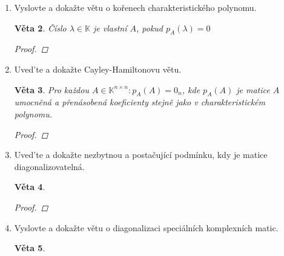 \documentclass[10pt,a4paper]{article}
\theoremstyle{plain}
\newtheorem{veta}{Věta}
\theoremstyle{definition}
\begin{document}
\begin{enumerate}
\begin{veta}
\begin{proof}
Nyní vyjádřeme 0 dvěma způsoby:

\[0 = \lambda_k 0 = \lambda_k \sum^k_{i=1} a_i u_i = \sum^k_{i=1} \lambda_k a_i u_i \]
\[ 0 = f(0) = f(\sum^k_{i=1} a_i u_i) = \sum^k_{i=1} a_i f(u_i) = \sum^k_{i=1} \lambda_i a_i u_i\]

\hfill

\[ 0 = 0 - 0 = \sum_{i = 1}^{k-1} (\lambda_i - \lambda_k) a_i u_i \]

$\lambda_i \neq \lambda_k \implies (\lambda_i - \lambda_k)a_i \neq 0$

$u_1, ..., u_{k-1}$ jsou lineárně závislé $\to$ spor s volbou $k$.

\end{proof}
\end{veta}

\item Vyslovte a dokažte větu o kořenech charakteristického polynomu.
\begin{veta}
Číslo $\lambda \in \mathbb{K}$ je vlastní $A$, pokud $p_A(\lambda) = 0$
\begin{proof}

\end{proof}
\end{veta}

\item Uved'te a dokažte Cayley-Hamiltonovu větu.


\begin{veta}
Pro každou $A \in \mathbb{K}^{n \times n}: p_A(A) = 0_n$, kde $p_A(A)$ je matice $A$ umocněná a přenásobená koeficienty stejně jako v charakteristickém polynomu.
\begin{proof}

\end{proof}
\end{veta}

\item Uved'te a dokažte nezbytnou a postačující podmínku, kdy je matice diagonalizovatelná.


\begin{veta}

\begin{proof}

\end{proof}
\end{veta}

\item Vyslovte a dokažte větu o diagonalizaci speciálních komplexních matic.


\begin{veta}


\end{veta}
\end{enumerate}
\end{document}
